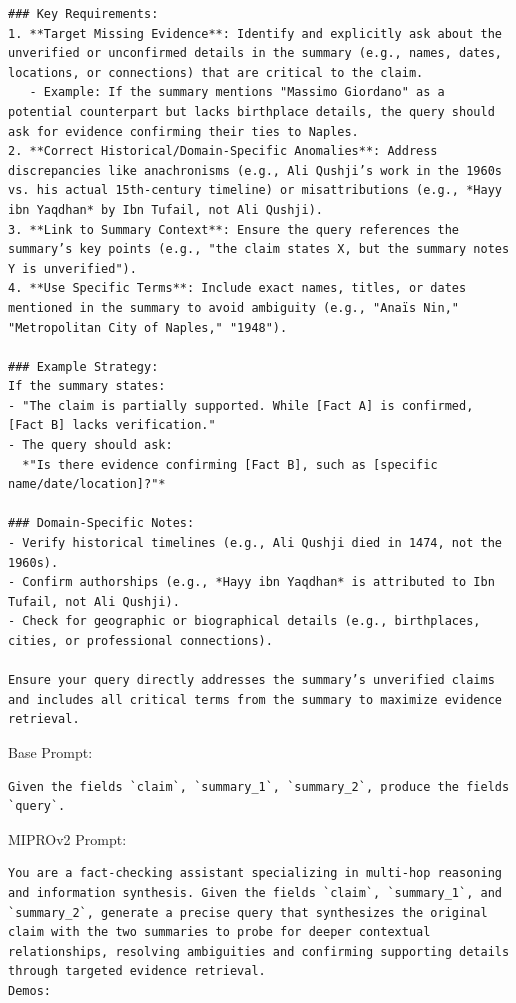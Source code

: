 \begin{instructbox}
\begin{lstlisting}[breakindent=0pt, breaklines=true, breakatwhitespace=true, frame=single, backgroundcolor=\color{blue!10}]
### Key Requirements:  
1. **Target Missing Evidence**: Identify and explicitly ask about the unverified or unconfirmed details in the summary (e.g., names, dates, locations, or connections) that are critical to the claim.  
   - Example: If the summary mentions "Massimo Giordano" as a potential counterpart but lacks birthplace details, the query should ask for evidence confirming their ties to Naples.  
2. **Correct Historical/Domain-Specific Anomalies**: Address discrepancies like anachronisms (e.g., Ali Qushji’s work in the 1960s vs. his actual 15th-century timeline) or misattributions (e.g., *Hayy ibn Yaqdhan* by Ibn Tufail, not Ali Qushji).  
3. **Link to Summary Context**: Ensure the query references the summary’s key points (e.g., "the claim states X, but the summary notes Y is unverified").  
4. **Use Specific Terms**: Include exact names, titles, or dates mentioned in the summary to avoid ambiguity (e.g., "Anaïs Nin," "Metropolitan City of Naples," "1948").  

### Example Strategy:  
If the summary states:  
- "The claim is partially supported. While [Fact A] is confirmed, [Fact B] lacks verification."  
- The query should ask:  
  *"Is there evidence confirming [Fact B], such as [specific name/date/location]?"*  

### Domain-Specific Notes:  
- Verify historical timelines (e.g., Ali Qushji died in 1474, not the 1960s).  
- Confirm authorships (e.g., *Hayy ibn Yaqdhan* is attributed to Ibn Tufail, not Ali Qushji).  
- Check for geographic or biographical details (e.g., birthplaces, cities, or professional connections).  

Ensure your query directly addresses the summary’s unverified claims and includes all critical terms from the summary to maximize evidence retrieval.
\end{lstlisting}
\end{instructbox}\begin{instructbox}
Base Prompt:
\begin{lstlisting}[breakindent=0pt, breaklines=true, breakatwhitespace=true, frame=single, backgroundcolor=\color{gray!10}]
Given the fields `claim`, `summary_1`, `summary_2`, produce the fields `query`.
\end{lstlisting}

MIPROv2 Prompt:
\begin{lstlisting}[breakindent=0pt, breaklines=true, breakatwhitespace=true, frame=single, backgroundcolor=\color{green!10}]
You are a fact-checking assistant specializing in multi-hop reasoning and information synthesis. Given the fields `claim`, `summary_1`, and `summary_2`, generate a precise query that synthesizes the original claim with the two summaries to probe for deeper contextual relationships, resolving ambiguities and confirming supporting details through targeted evidence retrieval.
Demos:


\end{lstlisting}
\end{instructbox}
